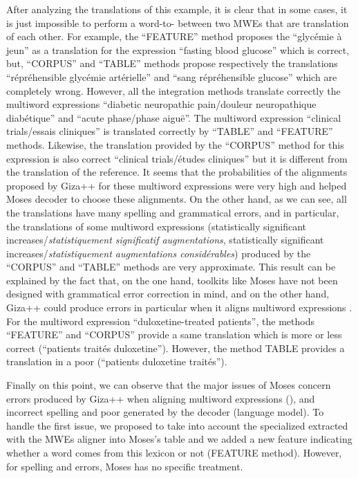 \documentclass[output=paper,modfonts,nonflat]{langsci/langscibook}
\begin{document}
After analyzing the translations of this example, it is clear that in some cases, it is just impossible to perform a word-to- between two MWEs that are translation of each other. For example, the ``FEATURE'' method proposes the  “glycémie à jeun” as a translation for the expression “fasting blood glucose” which is correct, but, ``CORPUS'' and ``TABLE'' methods propose respectively the translations “répréhensible glycémie artérielle” and “sang répréhensible glucose” which are completely wrong. However, all the integration methods translate correctly the multiword expressions “diabetic neuropath\-ic pain/douleur neuropathique diabétique” and “acute phase/phase aiguë”. The multiword expression “clinical trials/essais cliniques” is translated correctly by ``TABLE'' and ``FEATURE'' methods. Likewise, the translation provided by the ``CORPUS'' method for this expression is also correct “clinical trials/études cliniques” but it is different from the translation of the reference. It seems that the probabilities of the alignments proposed by Giza++ for these multiword expressions were very high and helped Moses decoder to choose these alignments. On the other hand, as we can see, all the translations have many spelling and grammatical errors, and in particular, the translations of some multiword expressions (statistically significant increases/\textit{statistiquement significatif augmentations}, statistically significant increases/\textit{statistiquement augmentations considérables}) produced by the ``CORPUS'' and ``TABLE'' methods are very approximate. This result can be explained by the fact that, on the one hand,  toolkits like Moses have not been designed with grammatical error correction in mind, and on the other hand, Giza++ could produce errors in particular when it aligns multiword expressions  \citep{fraser2007measuring}. For the multiword expression “duloxetine-treated patients”, the methods ``FEATURE'' and ``CORPUS'' provide a same translation which is more or less correct (``patients traités duloxetine''). However, the method TABLE provides a translation in a poor  (``patients duloxetine traités'').

Finally on this point, we can observe that the major issues of Moses concern errors produced by Giza++ when aligning multiword expressions (), and incorrect spelling and poor  generated by the decoder (language model). To handle the first issue, we proposed to take into account the specialized  extracted with the MWEs aligner into Moses’s  table and we added a new feature indicating whether a word comes from this lexicon or not (FEATURE method). However, for spelling and  errors, Moses has no specific treatment.
\end{document}
